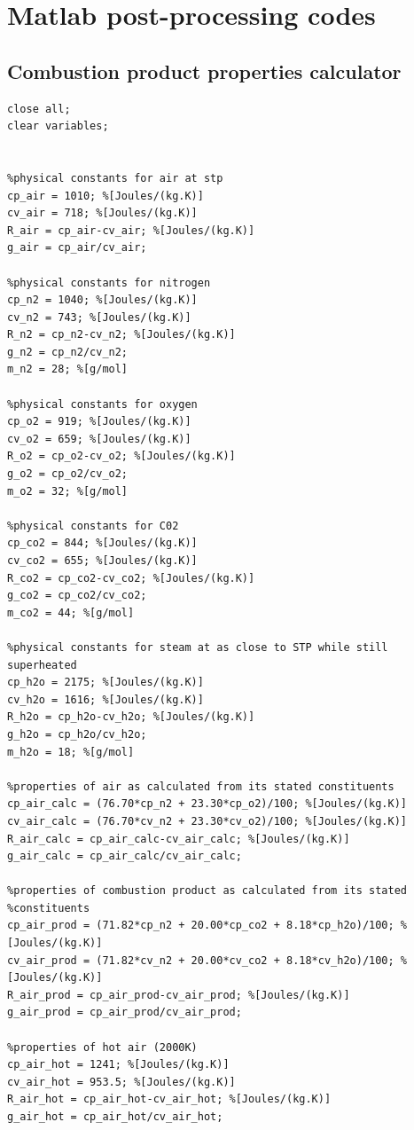 \documentclass[a4paper, 11pt, oneside]{report}
\begin{document}
\appendix



\chapter{Matlab post-processing codes}

\section{Combustion product properties calculator}
\begin{verbatim}
close all;
clear variables;


%physical constants for air at stp
cp_air = 1010; %[Joules/(kg.K)]
cv_air = 718; %[Joules/(kg.K)]
R_air = cp_air-cv_air; %[Joules/(kg.K)]
g_air = cp_air/cv_air; 

%physical constants for nitrogen
cp_n2 = 1040; %[Joules/(kg.K)]
cv_n2 = 743; %[Joules/(kg.K)]
R_n2 = cp_n2-cv_n2; %[Joules/(kg.K)]
g_n2 = cp_n2/cv_n2;
m_n2 = 28; %[g/mol]

%physical constants for oxygen
cp_o2 = 919; %[Joules/(kg.K)]
cv_o2 = 659; %[Joules/(kg.K)]
R_o2 = cp_o2-cv_o2; %[Joules/(kg.K)]
g_o2 = cp_o2/cv_o2;
m_o2 = 32; %[g/mol]

%physical constants for C02
cp_co2 = 844; %[Joules/(kg.K)]
cv_co2 = 655; %[Joules/(kg.K)]
R_co2 = cp_co2-cv_co2; %[Joules/(kg.K)]
g_co2 = cp_co2/cv_co2;
m_co2 = 44; %[g/mol]

%physical constants for steam at as close to STP while still superheated
cp_h2o = 2175; %[Joules/(kg.K)]
cv_h2o = 1616; %[Joules/(kg.K)]
R_h2o = cp_h2o-cv_h2o; %[Joules/(kg.K)]
g_h2o = cp_h2o/cv_h2o;
m_h2o = 18; %[g/mol]

%properties of air as calculated from its stated constituents
cp_air_calc = (76.70*cp_n2 + 23.30*cp_o2)/100; %[Joules/(kg.K)]
cv_air_calc = (76.70*cv_n2 + 23.30*cv_o2)/100; %[Joules/(kg.K)]
R_air_calc = cp_air_calc-cv_air_calc; %[Joules/(kg.K)]
g_air_calc = cp_air_calc/cv_air_calc;

%properties of combustion product as calculated from its stated
%constituents
cp_air_prod = (71.82*cp_n2 + 20.00*cp_co2 + 8.18*cp_h2o)/100; %[Joules/(kg.K)]
cv_air_prod = (71.82*cv_n2 + 20.00*cv_co2 + 8.18*cv_h2o)/100; %[Joules/(kg.K)]
R_air_prod = cp_air_prod-cv_air_prod; %[Joules/(kg.K)]
g_air_prod = cp_air_prod/cv_air_prod;

%properties of hot air (2000K)
cp_air_hot = 1241; %[Joules/(kg.K)]
cv_air_hot = 953.5; %[Joules/(kg.K)]
R_air_hot = cp_air_hot-cv_air_hot; %[Joules/(kg.K)]
g_air_hot = cp_air_hot/cv_air_hot;


\end{verbatim}
\end{document}

